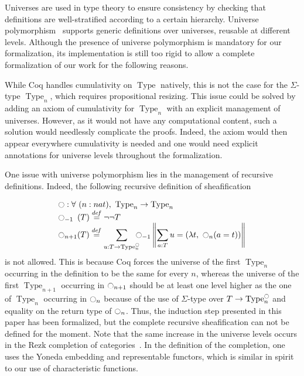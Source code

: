 \documentclass[notfinal]{jfrarticle}
\DeclareMathOperator{\Type}{Type}
\newcommand \defeq {\overset{de\hspace{-0.2ex}f}{=}}
\newcommand{\modal}{\ensuremath{\ocircle}}
\begin{document}
Universes are used in type theory to ensure consistency by checking
that definitions are well-stratified according to a certain hierarchy.
%
Universe polymorphism~\cite{sozeau2014universe} supports generic
definitions over universes, reusable at different levels.
%
Although the presence of universe polymorphism is mandatory for our
formalization, its implementation is still too rigid to allow a
complete formalization of our work for the following reasons.

%
While Coq handles cumulativity on $\Type$ natively, this is not
the case for the $\Sigma$-type $\Type_n$, which requires propositional
resizing. 
%
This issue could be solved by adding an axiom of cumulativity
for $\Type_n$ with an explicit management of universes. 
%
However, as it would not have any computational content, such a solution
would needlessly complicate the proofs. Indeed, the axiom would then appear
everywhere cumulativity is needed and one would need explicit
annotations for universe levels throughout the formalization.
%

One issue with universe polymorphism lies in the management of
recursive definitions. Indeed, the following recursive definition of
sheafification

%
\[ \begin{array}{l}
   \modal : \forall \ (n : nat), \ \Type_n \to \Type_n 
   \\
    \modal_{-1\phantom{n}}(T) \defeq\lnot\lnot T \\

      \displaystyle{\modal_{n+1}(T)} \defeq  
      \displaystyle{\sum_{u:T \to \Type_n^\modal} \!\!\!\!\modal_{-1} 
      \left\|
      \sum_{a:T} u= (\lambda t,~\modal_n (a=t))
      \right\|}
    \end{array}
\]
%
is not allowed. 
%
This is because Coq forces the universe of the first $\Type_n$
occurring in the definition to be the same for every $n$, whereas the
universe of the first $\Type_{n+1}$ occurring in $\modal_{n+1}$ should be at
least one level higher as the one of $\Type_n$ occurring in
$\modal_{n}$ because of the use of $\Sigma$-type over
$T \to \Type_n^\modal$ and equality on the return type of $\modal_n$.
%
%
Thus, the induction step presented in this paper has been formalized,
but the complete recursive sheafification can not be defined for the
moment.
%
Note that the same increase in the universe levels occurs in the
Rezk completion of categories~\cite{rezk}. In the definition of the
completion, one uses the Yoneda embedding and representable functors,
which is similar in spirit to our use of characteristic functions.
 
\end{document}
